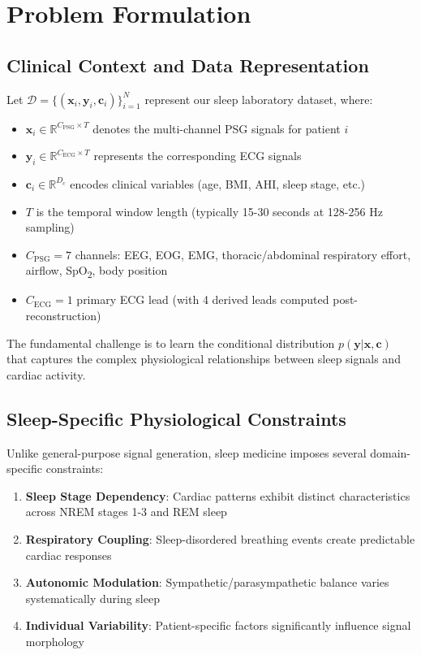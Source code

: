 \documentclass[11pt]{article}
\begin{document}
\section{Problem Formulation}

\subsection{Clinical Context and Data Representation}

Let $\mathcal{D} = \{(\mathbf{x}_i, \mathbf{y}_i, \mathbf{c}_i)\}_{i=1}^N$ represent our sleep laboratory dataset, where:

\begin{itemize}
    \item $\mathbf{x}_i \in \mathbb{R}^{C_{\text{PSG}} \times T}$ denotes the multi-channel PSG signals for patient $i$
    \item $\mathbf{y}_i \in \mathbb{R}^{C_{\text{ECG}} \times T}$ represents the corresponding ECG signals
    \item $\mathbf{c}_i \in \mathbb{R}^{D_c}$ encodes clinical variables (age, BMI, AHI, sleep stage, etc.)
    \item $T$ is the temporal window length (typically 15-30 seconds at 128-256 Hz sampling)
    \item $C_{\text{PSG}} = 7$ channels: EEG, EOG, EMG, thoracic/abdominal respiratory effort, airflow, SpO\textsubscript{2}, body position
    \item $C_{\text{ECG}} = 1$ primary ECG lead (with 4 derived leads computed post-reconstruction)
\end{itemize}

The fundamental challenge is to learn the conditional distribution $p(\mathbf{y}|\mathbf{x}, \mathbf{c})$ that captures the complex physiological relationships between sleep signals and cardiac activity.

\subsection{Sleep-Specific Physiological Constraints}

Unlike general-purpose signal generation, sleep medicine imposes several domain-specific constraints:

\begin{enumerate}
    \item \textbf{Sleep Stage Dependency}: Cardiac patterns exhibit distinct characteristics across NREM stages 1-3 and REM sleep
    \item \textbf{Respiratory Coupling}: Sleep-disordered breathing events create predictable cardiac responses
    \item \textbf{Autonomic Modulation}: Sympathetic/parasympathetic balance varies systematically during sleep
    \item \textbf{Individual Variability}: Patient-specific factors significantly influence signal morphology
\end{enumerate}
\end{document}
